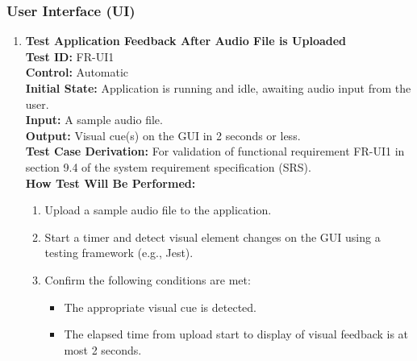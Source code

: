 \documentclass[12pt, titlepage]{article}
\begin{document}
  \subsubsection{User Interface (UI)}
  \begin{enumerate}
    \item \textbf{Test Application Feedback After Audio File is Uploaded} \\
      \newline
      \textbf{Test ID:} FR-UI1 \\
      \textbf{Control:} Automatic \\
      \textbf{Initial State:} Application is running and idle, awaiting audio input from the user. \\
      \textbf{Input:} A sample audio file. \\
      \textbf{Output:} Visual cue(s) on the GUI in 2 seconds or less. \\
      \textbf{Test Case Derivation:} For validation of functional requirement FR-UI1 in section 9.4 of the system requirement specification (SRS). \\
      \textbf{How Test Will Be Performed:}
      \begin{enumerate}
          \item Upload a sample audio file to the application.
          \item Start a timer and detect visual element changes on the GUI using a testing framework (e.g., Jest).
          \item Confirm the following conditions are met:
          \begin{itemize}
              \item The appropriate visual cue is detected.
              \item The elapsed time from upload start to display of visual feedback is at most 2 seconds.
          \end{itemize}
      \end{enumerate}
    

\end{enumerate}
\end{document}

